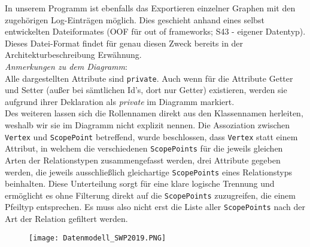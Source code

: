 \documentclass[enabledeprecatedfontcommands,fontsize=11pt,paper=a4,twoside]{scrartcl}
\begin{document}
In unserem Programm ist ebenfalls das Exportieren einzelner Graphen mit den zugehörigen Log-Einträgen möglich. Dies geschieht anhand eines selbst entwickelten Dateiformates (OOF für \glqq out of frameworks\grqq; S43 - eigener Datentyp). Dieses Datei-Format findet für genau diesen Zweck bereits in der Architekturbeschreibung Erwähnung.  \\

\textit{Anmerkungen zu dem Diagramm}: \\
Alle dargestellten Attribute sind \texttt{private}. Auch wenn für die Attribute Getter und Setter (außer bei sämtlichen Id's, dort nur Getter) existieren, werden sie aufgrund ihrer Deklaration als \textit{private} im Diagramm markiert. \\
Des weiteren lassen sich die Rollennamen direkt aus den Klassennamen herleiten, weshalb wir sie im Diagramm nicht explizit nennen. Die Assoziation zwischen \texttt{Vertex} und \texttt{ScopePoint} betreffend, wurde beschlossen, dass \texttt{Vertex} statt einem Attribut, in welchem die verschiedenen \texttt{ScopePoints} für die jeweils gleichen Arten der Relationstypen zusammengefasst werden, drei Attribute gegeben werden, die jeweils ausschließlich gleichartige \texttt{ScopePoints} eines Relationstyps beinhalten. Diese Unterteilung sorgt für eine klare logische Trennung und ermöglicht es ohne Filterung direkt auf die \texttt{ScopePoints} zuzugreifen, die einem Pfeiltyp entsprechen. Es muss also nicht erst die Liste aller \texttt{ScopePoints} nach der Art der Relation gefiltert werden.\\

\begin{landscape}
	\begin{figure}
		\centering
		\texttt{[image: Datenmodell\_SWP2019.PNG]}
	\end{figure}
\end{landscape}
\end{document}
